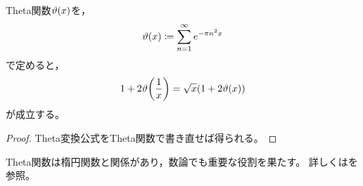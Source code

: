 \documentclass[a4paper,draft]{ltjsarticle}
\begin{document}
\begin{cor}[Theta関数]\label{cor:Poisson-Theta変換公式}
    Theta関数$\fun{\vartheta}{x}$を，
    \begin{equation}
        \fun{\vartheta}{x}\coloneqq \sum_{n=1}^\infty e^{-\pi n^2 x} \label{eq:Poisson-Theta関数}
    \end{equation}
    で定めると，
    \begin{equation}
        1+2\fun{\vartheta}{\dfrac{1}{x}}=\sqrt{x}\pare{1+2\fun{\vartheta}{x}}
    \end{equation}
    が成立する。
    \begin{proof}
        Theta変換公式をTheta関数で書き直せば得られる。
    \end{proof}
\end{cor}

Theta関数は楕円関数と関係があり，数論でも重要な役割を果たす。
詳しくは\cite[小山]{koyama}を参照。
\end{document}
